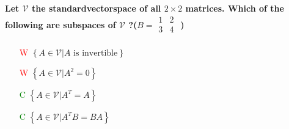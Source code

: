 \documentclass[7pt,landscape, margin = 0.1mm]{article}
\begin{document}
\begin{multicols}{4}
\begin{flushleft}
\begin{itemize}
\end{itemize}

\hspace{3mm}


\textbf{ Let $\mathcal{V} $ the standardvectorspace of all $2 \times 2 $ matrices. Which of the following are subspaces of $\mathcal{V} $ ?($B = \begin{smallmatrix}
 1& 2 \\
 3&4  \\
\end{smallmatrix}$ )}
\begin{itemize}
\item[\textcolor{red}{W}]  $\left\{A \in \mathcal{V} | A \text{ is invertible} \right\}$ 
\item[\textcolor{red}{W}] $\left\{A \in \mathcal{V} | A^2 = 0 \right\}$
\item[\textcolor{green}{C}] $\left\{A \in \mathcal{V} | A^T = A \right\}$ 
\item[\textcolor{green}{C}]  $\left\{A \in \mathcal{V} | A^T B= BA \right\}$
\end{itemize}
\hspace{3mm}


\end{flushleft}
\end{multicols}
\end{document}
